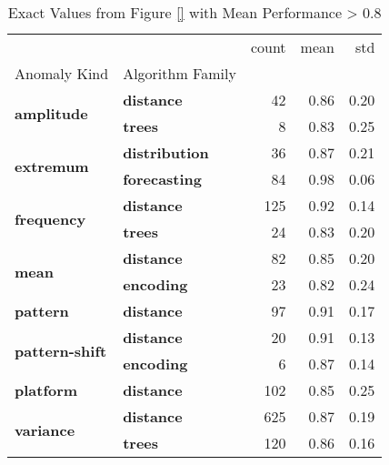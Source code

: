 \begin{table}
\centering
\caption{Exact Values from Figure \ref{} with Mean Performance > 0.8}
\label{tab:best-performer}
\begin{tabular}{llrrr}
\toprule
 &  & count & mean & std \\
Anomaly Kind & Algorithm Family &  &  &  \\
\midrule
\multirow[t]{2}{*}{\textbf{amplitude}} & \textbf{distance} & 42 & 0.86 & 0.20 \\
\textbf{} & \textbf{trees} & 8 & 0.83 & 0.25 \\
\cline{1-5}
\multirow[t]{2}{*}{\textbf{extremum}} & \textbf{distribution} & 36 & 0.87 & 0.21 \\
\textbf{} & \textbf{forecasting} & 84 & 0.98 & 0.06 \\
\cline{1-5}
\multirow[t]{2}{*}{\textbf{frequency}} & \textbf{distance} & 125 & 0.92 & 0.14 \\
\textbf{} & \textbf{trees} & 24 & 0.83 & 0.20 \\
\cline{1-5}
\multirow[t]{2}{*}{\textbf{mean}} & \textbf{distance} & 82 & 0.85 & 0.20 \\
\textbf{} & \textbf{encoding} & 23 & 0.82 & 0.24 \\
\cline{1-5}
\textbf{pattern} & \textbf{distance} & 97 & 0.91 & 0.17 \\
\cline{1-5}
\multirow[t]{2}{*}{\textbf{pattern-shift}} & \textbf{distance} & 20 & 0.91 & 0.13 \\
\textbf{} & \textbf{encoding} & 6 & 0.87 & 0.14 \\
\cline{1-5}
\textbf{platform} & \textbf{distance} & 102 & 0.85 & 0.25 \\
\cline{1-5}
\multirow[t]{2}{*}{\textbf{variance}} & \textbf{distance} & 625 & 0.87 & 0.19 \\
\textbf{} & \textbf{trees} & 120 & 0.86 & 0.16 \\
\cline{1-5}
\bottomrule
\end{tabular}
\end{table}
